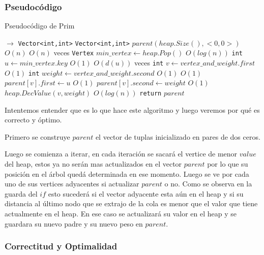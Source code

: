\subsubsection{Pseudocódigo}

\begin{algorithm}[H]
  \begin{algorithmic}[1]
  \caption{Pseudocódigo de Prim}
  \label{algo:2-1}
     $\rightarrow$ \texttt{Vector<int,int>}
    	\State \texttt{Vector<int,int>} $parent(heap.Size(), <0,0>)$
    	\Comment $O(n)$
    		\Comment $O(n)$ veces
    		\State \texttt{Vertex} $min\_vertex \gets heap.Pop()$
    		\Comment $O(log(n))$
    		\State \texttt{int} $ u \gets min\_vertex.key$
    		\Comment $O(1)$
    		\Comment $O(d(u))$ veces
	    		\State \texttt{int} $ v \gets vertex\_and\_weight.first$
	    		\Comment $O(1)$    			
	    		\State \texttt{int} $ weight \gets vertex\_and\_weight.second$
	    		\Comment $O(1)$    			
    			\Comment $O(1)$
    				\State $parent[v].first \gets u$
    				\Comment $O(1)$
    				\State $parent[v].second \gets weight$
    				\Comment $O(1)$
    				\State $heap.DecValue(v, weight)$
    				\Comment $O(log(n))$
    			\EndIf
    		\EndFor
    	\EndWhile
    	\State \texttt{return} $parent$
		\EndProcedure
	\end{algorithmic}
\end{algorithm}

Intentemos entender que es lo que hace este algoritmo y luego veremos por qué es correcto y óptimo.

Primero se construye $parent$ el vector de tuplas inicializado en pares de dos ceros. 

Luego se comienza a iterar, en cada iteración se sacará el vertice de menor $value$ del heap, estos ya no serán mas actualizados en el vector $parent$ por lo que su posición en el árbol quedá determinada en ese momento. Luego se ve por cada uno de sus vertices adyacentes si actualizar $parent$ o no. Como se observa en la guarda del $if$ esto sucederá si el vector adyacente esta aún en el heap y si su distancia al último nodo que se extrajo de la cola es menor que el valor que tiene actualmente en el heap. En ese caso se actualizará su valor en el heap y se guardara su nuevo padre y su nuevo peso en $parent$.

\subsubsection{Correctitud y Optimalidad}

